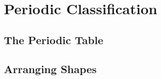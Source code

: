 \section{Periodic Classification} 

\begin{multicols}{2}


\section*{The Periodic Table} %


%
%

\subsection{Arranging Shapes}


\end{multicols}
